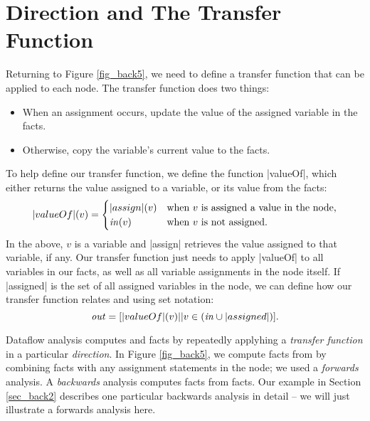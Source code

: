 \documentclass[12pt]{report}
\begin{document}
\section{Direction and The Transfer Function}
Returning to Figure \ref{fig_back5}, we need to define a transfer
function that can be applied to each node. The transfer function does
two things:
\begin{itemize}
\item When an assignment occurs, update the value of the assigned variable in the \out facts.
\item Otherwise, copy the variable's current value to the \out facts.
\end{itemize}
To help define our transfer function, we define the function |valueOf|,
which either returns the value assigned to a variable, or its value
from the \inE facts:
\begin{equation} |valueOf|(v) = 
  \begin{cases}
    |assign|(v) & \text{when $v$ is assigned a value in the node,} \\
    \text{\emph{in}}(v) & \text{when $v$ is not assigned.} 
  \end{cases}
\label{eqn_back2}
\end{equation}
In the above, $v$ is a variable and |assign| retrieves the value assigned to
that variable, if any.
Our transfer function just needs to apply |valueOf| to all variables
in our \inE facts, as well as all variable assignments in the node
itself. If |assigned| is the set of all assigned variables in the
node, we can define how our transfer function relates \inE and \out using
set notation:
\begin{equation}
  \text{\emph{out}} = [|valueOf|(v) || v \in (\text{\emph{in}} \cup |assigned|)].
\end{equation}

Dataflow analysis computes \inE and \out facts by repeatedly applyhing
a \emph{transfer function} in a particular \emph{direction}. In Figure
\ref{fig_back5}, we compute \out facts from by combining \inE facts
with any assignment statements in the node; we used a \emph{forwards}
analysis. A \emph{backwards} analysis computes \inE facts from \out
facts. Our example in Section \ref{sec_back2} describes one particular
backwards analysis in detail -- we will just illustrate a forwards
analysis here.

\end{document}
